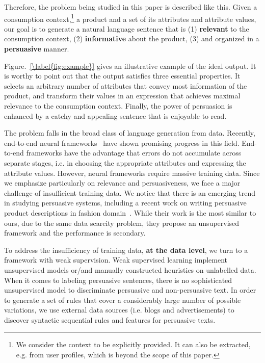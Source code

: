 \documentclass[sigconf]{acmart}
\begin{document}
Therefore, the problem being studied in this paper is described like this.
Given a  consumption context,\footnote{We consider the context to be explicitly provided. It can also be extracted, e.g. from user profiles, which is beyond the scope of this paper.}
a product and a set of its attributes and attribute values,
our goal is to generate a natural language sentence that is 
(1) \textbf{relevant} to the consumption context, (2) \textbf{informative} about the product, (3) and organized in a \textbf{persuasive} manner.

Figure.~\ref{\label{fig:example}} gives an illustrative example of the ideal output.
It is worthy to point out that the output satisfies three essential properties. 
It selects an arbitrary number of attributes that convey most information of the product,
and transform their values in an expression that achieves maximal relevance to the consumption context. 
Finally, the power of persuasion is enhanced by a catchy and appealing sentence that is enjoyable to read.

The problem falls in the broad class of language generation from data. Recently, end-to-end neural frameworks~\cite{Wiseman2017Challenges,Yang2017Reference,Lebret2016Neural,Karpathy2015Deep} have shown promising progress in this field. End-to-end frameworks have the advantage that errors do not accumulate across separate stages, i.e. in choosing the appropriate attributes and expressing the attribute values. However, neural frameworks require massive training data. Since we emphasize particularly on relevance and persuasiveness, we face a major challenge of  insufficient training data. We notice that there is an emerging trend in studying persuasive systems, including a recent work on writing persuasive product descriptions in fashion domain~\cite{munigala2018persuaide}. While their work is the most similar to ours, due to the same data scarcity problem, they propose an unsupervised framework and the performance is secondary.

To address the insufficiency of training data, \textbf{at the data level}, we turn to a framework with weak supervision. 
Weak supervised learning implement unsupervised models or/and manually constructed heuristics on unlabelled data.
When it comes to labeling persuasive sentences, there is no sophisticated  unsupervised model to discriminate persuasive and non-persuasive text. 
In order to generate a set of rules that cover a considerably large number of possible variations, we use external data sources (i.e. blogs and advertisements) to discover syntactic sequential rules and features for persuasive texts.
\end{document}
